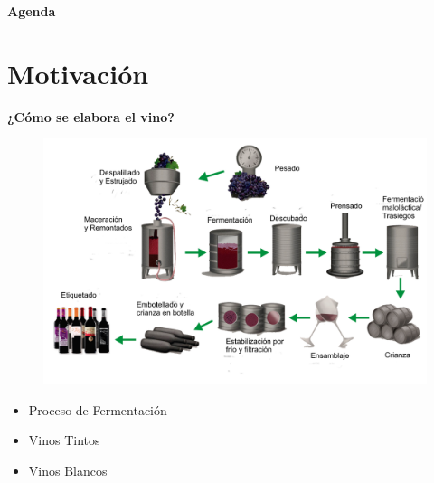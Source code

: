 \documentclass[11pt]{beamer}
\begin{document}
\begin{frame}{\textbf{\LARGE{Agenda}}}
  \fontsize{18pt}{18}\selectfont
  \tableofcontents
\end{frame}

\section{Motivación}

\begin{frame}{\textbf{\LARGE{¿Cómo se elabora el vino?}}}
  \fontsize{18pt}{18}\selectfont
  \begin{minipage}[c]{1.0\linewidth}

    \hspace{-40px}
    \begin{minipage}[l]{0.30\linewidth}
      \begin{figure}[H]
        \includegraphics[width=1.7\textwidth]{./imagenes/elaboracion-del-vino-tinto.png}
      \end{figure}	  	  	
    \end{minipage}


    \begin{minipage}[c]{0.68\linewidth}
      \begin{itemize}
        \item Proceso de Fermentación 
          \vspace{15px}
        \item Vinos Tintos
          \vspace{15px}
        \item Vinos Blancos
      \end{itemize}	
    \end{minipage}

      \end{minipage}
\end{frame}
\end{document}
